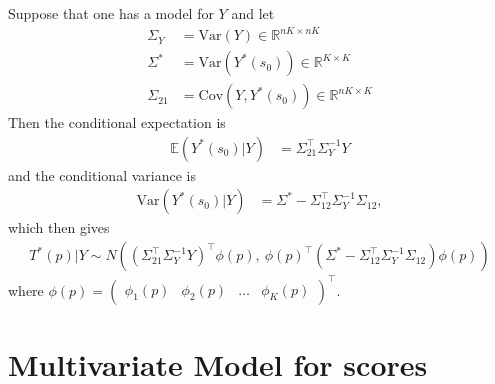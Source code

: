 \documentclass[11pt]{article}
\newcommand{\Var}{\textrm{Var}}
\newcommand{\Cov}{\textrm{Cov}}
\begin{document}
Suppose that one has a model for $Y$ and let
\begin{align*}
\Sigma_Y &= \Var(Y) \in \mathbb{R}^{nK \times nK}\\
\Sigma^* &=\Var(Y^*(s_0)) \in \mathbb{R}^{K\times K}\\
\Sigma_{21} &=\Cov(Y, Y^*(s_0)) \in \mathbb{R}^{nK\times K}
\end{align*}
%
Then the conditional expectation is
\begin{align*}
\mathbb{E}(Y^*(s_0) | Y) &= \Sigma_{21}^\top \Sigma_Y^{-1} Y
\end{align*}and the conditional variance is \begin{align*}
\Var(Y^*(s_0) | Y) &= \Sigma^* - \Sigma_{12}^\top \Sigma_Y^{-1} \Sigma_{12}, 
\end{align*}which then gives \begin{align*}
T^*(p) | Y \sim N\left( (\Sigma_{21}^\top \Sigma_Y^{-1} Y)^\top \phi(p),  \ \phi(p)^\top ( \Sigma^* - \Sigma_{12}^\top \Sigma_Y^{-1} \Sigma_{12}) \phi(p) \right)
\end{align*} where $\phi(p) = \begin{pmatrix} \phi_1(p) & \phi_2(p) & \dots & \phi_K(p)\end{pmatrix}^\top$. 






\section{Multivariate Model for scores}
\end{document}
